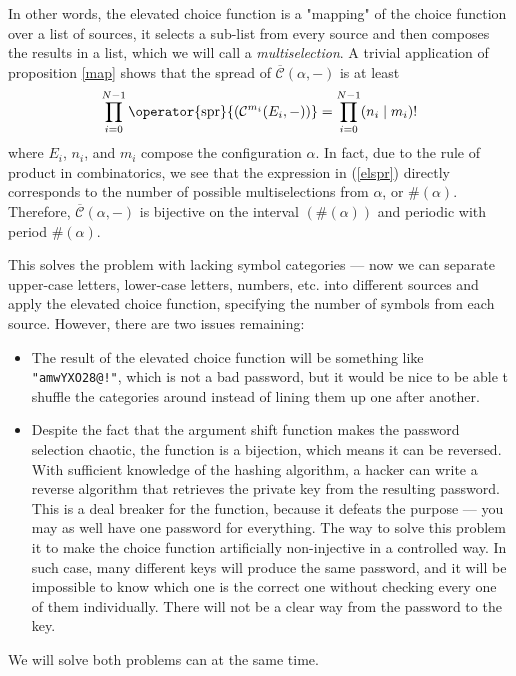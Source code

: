 \documentclass[12pt, a4paper]{article}
\renewcommand{\C}{\mathcal{C}}
\newcommand{\CC}{\overline{\mathcal{C}}}
\newcommand{\spr}[1]{\operator{\mathrm{spr}}{(#1)}}
\begin{document}
In other words, the elevated choice function is a "mapping" of the choice function over a list of sources, it selects a sub-list from every source and then composes the results in a list, which we will call a \emph{multiselection}. A trivial application of proposition \ref{map} shows that the spread of $ \CC(\alpha, -) $ is at least
\begin{equation}\label{elspr}
    \prod\limits_{i = 0}^{N-1} \spr{\C^{m_i}(E_i, -)} = \prod\limits_{i = 0}^{N-1} (n_i \mid m_i)!
\end{equation}
where $ E_i $, $ n_i $, and $ m_i $ compose the configuration $ \alpha $. In fact, due to the rule of product in combinatorics, we see that the expression in (\ref{elspr}) directly corresponds to the number of possible multiselections from $ \alpha $, or $ \#(\alpha) $. Therefore, $ \CC(\alpha, -) $ is bijective on the interval $ (\#(\alpha)) $ and periodic with period $ \#(\alpha) $.

This solves the problem with lacking symbol categories --- now we can separate upper-case letters, lower-case letters, numbers, etc. into different sources and apply the elevated choice function, specifying the number of symbols from each source. However, there are two issues remaining:

\begin{itemize}
    \item The result of the elevated choice function will be something like \texttt{"amwYXO28@!"}, which is not a bad password, but it would be nice to be able t shuffle the categories around instead of lining them up one after another.
    \item Despite the fact that the argument shift function makes the password selection chaotic, the function is a bijection, which means it can be reversed. With sufficient knowledge of the hashing algorithm, a hacker can write a reverse algorithm that retrieves the private key from the resulting password. This is a deal breaker for the function, because it defeats the purpose --- you may as well have one password for everything. The way to solve this problem it to make the choice function artificially non-injective in a controlled way. In such case, many different keys will produce the same password, and it will be impossible to know which one is the correct one without checking every one of them individually. There will not be a clear way from the password to the key.
\end{itemize}

We will solve both problems can at the same time.
\end{document}
